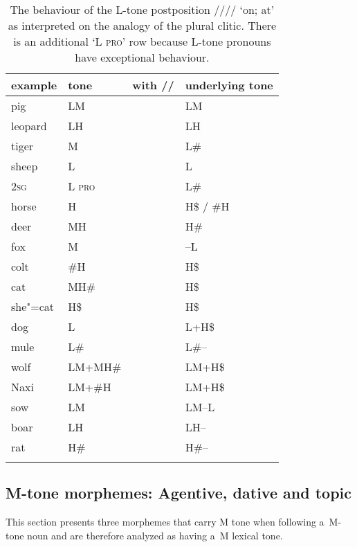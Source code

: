 \begin{table}%
	\caption{\label{tab:postpositiononsupplemented}The behaviour of the L-tone postposition //// ‘on; at' as interpreted on the {analogy} of the {plural} clitic. There is an additional ‘L \textsc{pro}’ row because L-tone pronouns have exceptional behaviour.}
	\begin{tabularx}{\textwidth}{ Q Q P{30mm} l }
		\lsptoprule
		example & tone & with // & underlying tone\\ \midrule
		pig & LM &  & LM\\
		leopard & LH &  & LH\\
		tiger & M &  & L\#\\
		sheep & L &  & L\\
		\textsc{2sg} & L \textsc{pro} &  & L\#\\
		horse & H &  & H\$ / \#H\\
		deer & MH &  & H\#\\ \addlinespace \hdashline \addlinespace
		fox & M &  & --L\\
		colt & \#H &  & H\$\\
		cat & MH\# &  & H\$\\
		she"=cat & H\$ &  & H\$\\
		dog & L &  & L+H\$\\
		mule & L\# &  & L\#--\\
		wolf & LM+MH\# &  & LM+H\$ \\
		Naxi & LM+\#H &  & LM+H\$\\
		sow & LM &  & LM--L\\
		boar & LH &  & LH--\\
		rat & H\# &  & H\#--\\
		\lspbottomrule
	\end{tabularx}
\end{table}

\subsection[M-tone morphemes]{M-tone morphemes: {Agentive}, {dative} and {topic}}
\label{sec:encliticsthatcarrymtonewhenfollowingamtonenoun}

This section presents three morphemes that carry M tone when following a~M-tone noun and are therefore analyzed as having a~M lexical tone. 

